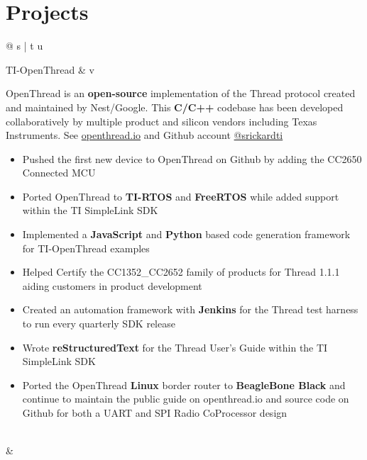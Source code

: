 \documentclass[a4paper,10pt]{article}
\begin{document}
\section{Projects}

\begin{tabular*}{\textwidth}{@{\extracolsep{\fill}} s | t u}

  TI-OpenThread &  {v} {
    OpenThread is an \textbf{open-source} implementation of the Thread protocol created and
    maintained by Nest/Google. This \textbf{C/C++} codebase has been developed collaboratively by
    multiple product and silicon vendors including Texas Instruments. See
    \href{https://openthread.io/}{openthread.io} and Github account
    \href{https://github.com/srickardti}{@srickardti}

    \begin{itemize}[nosep, leftmargin=1em]

      \item Pushed the first new device to OpenThread on Github by adding the CC2650 Connected MCU
      \item Ported OpenThread to \textbf{TI-RTOS} and \textbf{FreeRTOS} while added support within
            the TI SimpleLink SDK
      \item Implemented a \textbf{JavaScript} and \textbf{Python} based code generation framework
            for TI-OpenThread examples
      \item Helped Certify the CC1352\_CC2652 family of products for Thread 1.1.1 aiding customers
            in product development
      \item Created an automation framework with \textbf{Jenkins} for the Thread test harness to run
            every quarterly SDK release
      \item Wrote \textbf{reStructuredText} for the Thread User's Guide within the TI SimpleLink SDK
      \item Ported the OpenThread \textbf{Linux} border router to \textbf{BeagleBone Black} and
            continue to maintain the public guide on openthread.io and source code on Github for
            both a UART and SPI Radio CoProcessor design

    \end{itemize}\vspace*{-\baselineskip}\leavevmode
  }                                                                                               \\

   &                                                    \\


\end{tabular*}
\end{document}
